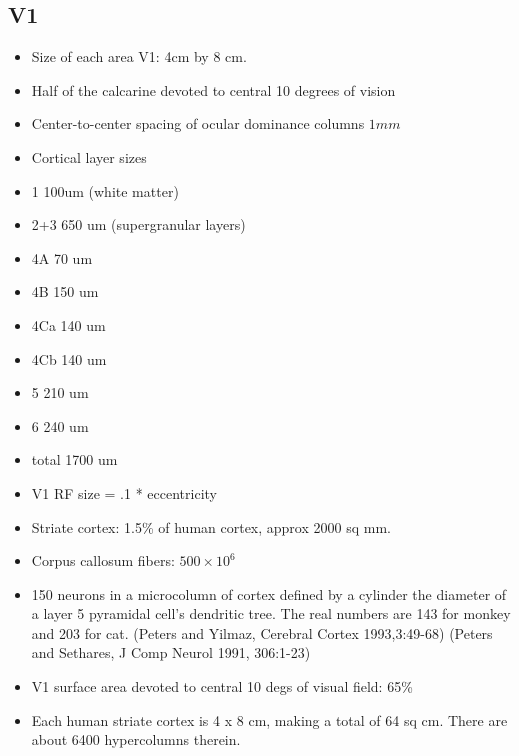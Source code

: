 \subsection*{V1}

\begin{itemize}

\item Size of each area V1: 4cm by 8 cm.


\item Half of the calcarine devoted to central 10 degrees of vision

\item Center-to-center spacing of ocular dominance columns $1mm$ 

\item Cortical layer sizes
 \be
 \item 1       100um (white matter)
 \item 2+3     650 um (supergranular layers)
 \item 4A       70 um
 \item 4B      150 um
 \item 4Ca 140 um
 \item 4Cb  140 um
 \item 5       210 um
 \item 6      240 um
 \item total  1700 um
 \ee

\item V1 RF size = .1 * eccentricity

\item Striate cortex: 1.5\% of human cortex, approx 2000 sq mm. %
\item Corpus callosum fibers: $500 \times 10^6$

\item 150 neurons in a microcolumn of cortex defined by a cylinder the
diameter of a layer 5 pyramidal cell's dendritic tree.  The real
numbers are 143 for monkey and 203 for cat.
(Peters and Yilmaz, Cerebral Cortex 1993,3:49-68) 
(Peters and Sethares, J Comp Neurol 1991, 306:1-23)

\item V1 surface area devoted to central 10 degs of visual field: 65\%

\item Each human striate cortex is 4 x 8 cm, making a total of 64 sq
cm.  There are about 6400 hypercolumns therein.


\end{itemize}
